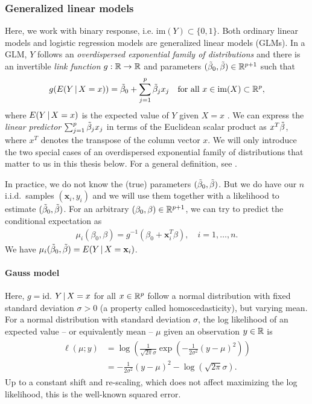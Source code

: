 \subsubsection{Generalized linear models}\label{subsubsec:glm}

Here, we work with binary response, i.e. $\mathrm{im}(Y) \subset \{0, 1\}$. Both ordinary 
linear models and logistic regression models are generalized linear models (GLMs). In 
a GLM, $Y$ follows an \textit{overdispersed exponential family of distributions} and there is an 
invertible \textit{link function}
$g: \mathbb{R} \to \mathbb{R}$ and parameters $(\tilde{\beta}_0, \tilde{\beta}) \in \mathbb{R}^{p+1}$ such that
\begin{align}
    g(E(Y \,|\, X = x)) = \tilde{\beta}_0 + \sum_{j=1}^p \tilde{\beta}_j x_j \quad 
    \text{for all } x \in \mathrm{im}(X) \subset \mathbb{R}^p,
\end{align}
where $E(Y \,|\, X = x)$ is the expected value of $Y$ given $X = x$ \cite{glm72}. We can express the 
\textit{linear predictor} $\sum_{j=1}^p \tilde{\beta}_j x_j$ in terms of the Euclidean scalar product 
as $x^T \tilde{\beta}$, where $x^T$ denotes the transpose of the column vector $x$. We will only introduce 
the two special cases of an overdispersed exponential family of distributions that matter to us in 
this thesis below. For a general definition, see \cite[section 1.1]{glm72}.

In practice, we do not know the (true) parameters
$(\tilde{\beta}_0, \tilde{\beta})$. But we do have our $n$ i.i.d.\ samples $(\mathbf{x}_i, y_i)$
and we will use them together with a likelihood to estimate $(\tilde{\beta}_0, \tilde{\beta})$. For an 
arbitrary $(\beta_0, \beta) \in \mathbb{R}^{p+1}$, we can try to predict the conditional expectation as
\begin{align}\label{eq:glm-mu}
    \mu_i(\beta_0, \beta) = g^{-1}(\beta_0 + \mathbf{x}_i^T \beta), \quad i = 1, \ldots, n.
\end{align}
We have $\mu_i(\tilde{\beta}_0, \tilde{\beta}) = E(Y \,|\, X = \mathbf{x}_i)$.

\paragraph{Gauss model}
Here, $g = \text{id}$. $Y \,|\, X = x$ for all $x \in \mathbb{R}^p$ follow a normal
distribution with fixed standard deviation $\sigma > 0$ (a property called homoscedasticity), but 
varying mean. For a normal distribution with standard deviation $\sigma$, the log likelihood of an 
expected value -- or equivalently mean -- $\mu$ given an observation $y \in \mathbb{R}$ is
\begin{align}
\begin{split}
    \ell(\mu; y) &= \log\left( \frac{1}{\sqrt{2\pi}\sigma} 
        \exp \left( -\frac{1}{2\sigma^2}(y - \mu)^2 \right) \right) \\
    &= -\frac{1}{2\sigma^2}(y - \mu)^2 - \log \left( \sqrt{2\pi}\sigma \right).
\end{split}
\end{align}
Up to a constant shift and re-scaling, which does not affect maximizing the log likelihood, this
is the well-known squared error.

